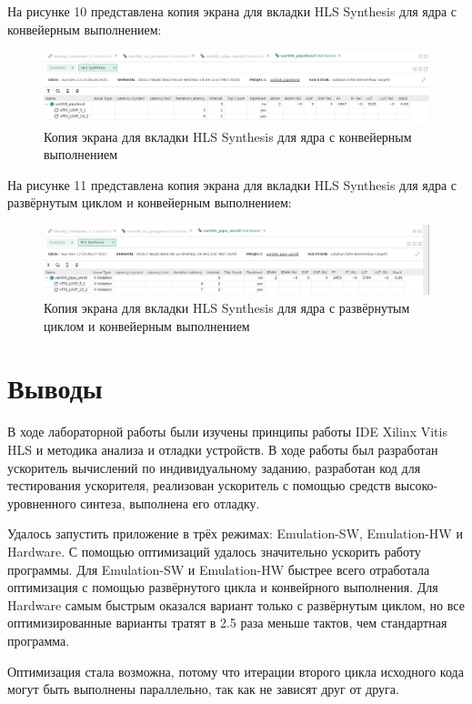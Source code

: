 На рисунке 10 представлена копия экрана для вкладки HLS Synthesis для ядра с конвейерным выполнением:
\FloatBarrier
\begin{figure}[h]
	\begin{center}
		\includegraphics[width=\linewidth]{inc/hlspipe.png}
	\end{center}
	\caption{Копия экрана для вкладки HLS Synthesis для ядра с конвейерным выполнением}
\end{figure}
\FloatBarrier

На рисунке 11 представлена копия экрана для вкладки HLS Synthesis для ядра с развёрнутым циклом и конвейерным выполнением:
\FloatBarrier
\begin{figure}[h]
	\begin{center}
		\includegraphics[width=\linewidth]{inc/hls2.png}
	\end{center}
	\caption{Копия экрана для вкладки HLS Synthesis для ядра с развёрнутым циклом и конвейерным выполнением}
\end{figure}
\FloatBarrier

\section*{Выводы}
В ходе лабораторной работы были изучены принципы работы IDE Xilinx Vitis HLS и методика анализа и отладки устройств. 
В ходе работы был разработан ускоритель вычислений по индивидуальному заданию, разработан код для тестирования ускорителя, реализован ускоритель с помощью средств высоко-уровненного синтеза, выполнена его отладку.

Удалось запустить приложение в трёх режимах: Emulation-SW, Emulation-HW и Hardware.
С помощью оптимизаций удалось значительно ускорить работу программы.
Для Emulation-SW и Emulation-HW быстрее всего отработала оптимизация с помощью развёрнутого цикла и конвейрного выполнения.
Для Hardware самым быстрым оказался вариант только с развёрнутым циклом, но все оптимизированные варианты тратят в 2.5 раза меньше тактов, чем стандартная программа.

Оптимизация стала возможна, потому что итерации второго цикла исходного кода могут быть выполнены параллельно, так как не зависят друг от друга.

